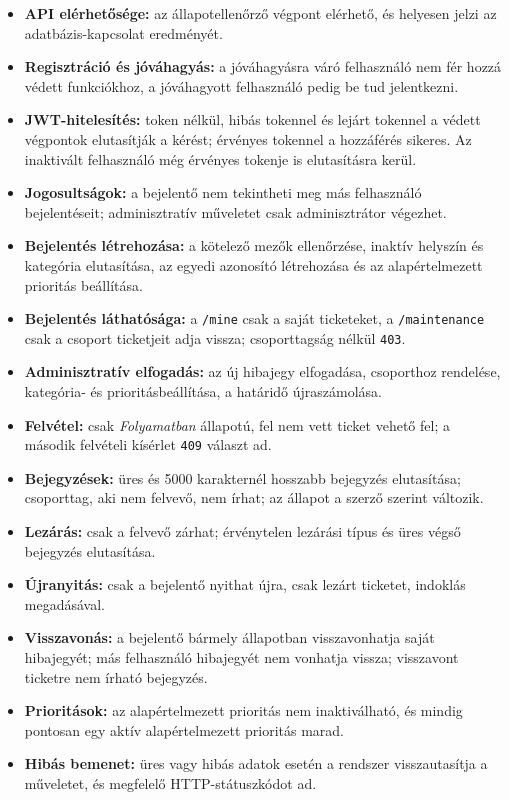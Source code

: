 \documentclass[12pt, a4paper, twoside]{article}
\begin{document}
\begin{itemize}
    \item \textbf{API elérhetősége:} az állapotellenőrző végpont elérhető, és helyesen jelzi az adatbázis-kapcsolat eredményét.
    \item \textbf{Regisztráció és jóváhagyás:} a jóváhagyásra váró felhasználó nem fér hozzá védett funkciókhoz, a jóváhagyott felhasználó pedig be tud jelentkezni.
    \item \textbf{JWT-hitelesítés:} token nélkül, hibás tokennel és lejárt tokennel a védett végpontok elutasítják a kérést; érvényes tokennel a hozzáférés sikeres. Az inaktivált felhasználó még érvényes tokenje is elutasításra kerül.
    \item \textbf{Jogosultságok:} a bejelentő nem tekintheti meg más felhasználó bejelentéseit; adminisztratív műveletet csak adminisztrátor végezhet.
    \item \textbf{Bejelentés létrehozása:} a kötelező mezők ellenőrzése, inaktív helyszín és kategória elutasítása, az egyedi azonosító létrehozása és az alapértelmezett prioritás beállítása.
    \item \textbf{Bejelentés láthatósága:} a \texttt{/mine} csak a saját ticketeket, a \texttt{/maintenance} csak a csoport ticketjeit adja vissza; csoporttagság nélkül \texttt{403}.
    \item \textbf{Adminisztratív elfogadás:} az új hibajegy elfogadása, csoporthoz rendelése, kategória- és prioritásbeállítása, a határidő újraszámolása.
    \item \textbf{Felvétel:} csak \textit{Folyamatban} állapotú, fel nem vett ticket vehető fel; a második felvételi kísérlet \texttt{409} választ ad.
    \item \textbf{Bejegyzések:} üres és 5000 karakternél hosszabb bejegyzés elutasítása; csoporttag, aki nem felvevő, nem írhat; az állapot a szerző szerint változik.
    \item \textbf{Lezárás:} csak a felvevő zárhat; érvénytelen lezárási típus és üres végső bejegyzés elutasítása.
    \item \textbf{Újranyitás:} csak a bejelentő nyithat újra, csak lezárt ticketet, indoklás megadásával.
    \item \textbf{Visszavonás:} a bejelentő bármely állapotban visszavonhatja saját hibajegyét; más felhasználó hibajegyét nem vonhatja vissza; visszavont ticketre nem írható bejegyzés.
    \item \textbf{Prioritások:} az alapértelmezett prioritás nem inaktiválható, és mindig pontosan egy aktív alapértelmezett prioritás marad.
    \item \textbf{Hibás bemenet:} üres vagy hibás adatok esetén a rendszer visszautasítja a műveletet, és megfelelő HTTP-státuszkódot ad.
\end{itemize}
\end{document}
